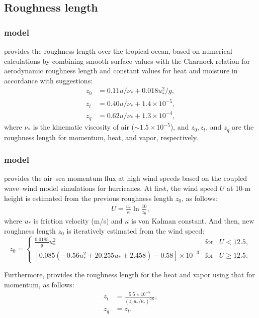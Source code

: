 \subsection{Roughness length}
\subsubsection{\citet{miller_1992} model}
\citet{miller_1992} provides the roughness length over the tropical ocean,
based on numerical calculations by combining smooth surface values
with the Charnock relation for aerodynamic roughness length
and constant values for heat and moisture in accordance with \citet{Smith_1988,Smith_1989} suggestions:
\begin{align}
  z_0 &= 0.11u/\nu_* + 0.018u_*^2/g, \label{eq: z_0} \\
  z_t &= 0.40u/\nu_* + 1.4 \times 10^{-5}, \label{eq: z_t} \\
  z_q &= 0.62u/\nu_* + 1.3 \times 10^{-4}, \label{eq: z_q}
\end{align}
where $\nu_*$ is the kinematic viscosity of air ($\sim 1.5 \times 10^{-5}$), and $z_0, z_t$,
and $z_q$ are the roughness length for momentum, heat, and vapor, respectively.

\subsubsection{\citet{moon_2007} model}
\citet{moon_2007} provides the air--sea momentum flux at high wind speeds
based on the coupled wave--wind model simulations for hurricanes.
At first, the wind speed $U$ at 10-m height is estimated from the previous roughness length $z_0$, as follows:
\begin{align}
  U =\frac{u_{*}}{\kappa} \ln \frac{10}{z_0},
\end{align}
where
$u_{*}$ is friction velocity (m/s)
and $\kappa$ is von Kalman constant.
And then, new roughness length $z_0$ is iteratively estimated from the wind speed:
\begin{equation}
  z_0   = \left\{
  \begin{array}{lll}
    \frac{0.0185}{g} u_{*}^2 & \mathrm{for} & U < 12.5, \\
    \left[ 0.085 \left( -0.56 u_{*}^2 + 20.255 u_{*} + 2.458 \right) - 0.58 \right] \times 10^{-3} & \mathrm{for} & U \ge 12.5.
   \end{array} \right.
\end{equation}

Furthermore, \citet{Fairall_2003} provides the roughness length for the heat and vapor
using that for momentum, as follows:
\begin{align}
  z_t &= \frac{ 5.5 \times 10^{-5} }{ ( z_0 u_{*} / \nu_{*} )^{0.6} }, \\
  z_q &= z_t.
\end{align}


